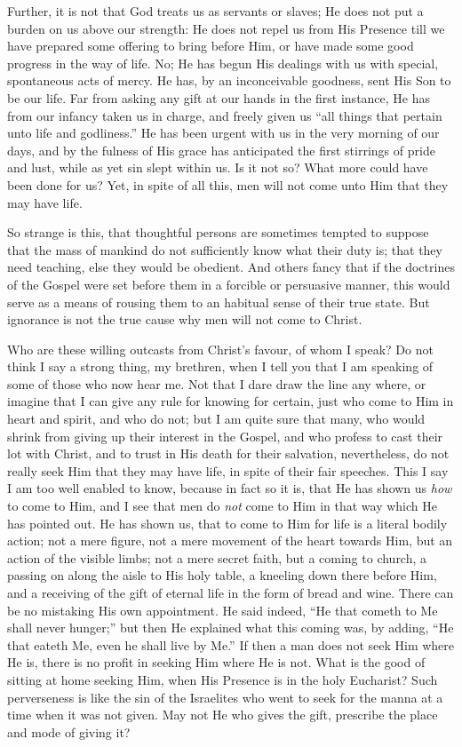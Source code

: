 Further, it is not that God treats us as servants or slaves; He
does not put a burden on us above our strength: He does not repel us
from His Presence till we have prepared some offering to bring before
Him, or have made some good progress in the way of life. No; He has
begun His dealings with us with special, spontaneous acts of mercy. He
has, by an inconceivable goodness, sent His Son to be our life. Far
from asking any gift at our hands in the first instance, He has from
our infancy taken us in charge, and freely given us ``all things
that pertain unto life and godliness.'' He has been urgent with us
in the very morning of our days, and by the fulness of His grace has
anticipated the first stirrings of pride and lust, while as yet sin
slept within us. Is it not so? What more could have been done for us?
Yet, in spite of all this, men will not come unto Him that they may
have life.

So strange is this, that thoughtful persons are sometimes tempted
to suppose that the mass of mankind do not sufficiently know what
their duty is; that they need teaching, else they would be obedient.
And others fancy that if the doctrines of the Gospel were set before
them in a forcible or persuasive manner, this would serve as a means
of rousing them to an habitual sense of their true state. But
ignorance is not the true cause why men will not come to Christ.

Who are these willing outcasts from Christ's favour, of whom I
speak? Do not think I say a strong thing, my brethren, when I tell you
that I am speaking of some of those who now hear me. Not that I dare
draw the line any where, or imagine that I can give any rule for
knowing for certain, just who come to Him in heart and spirit, and who
do not; but I am quite sure that many, who would shrink from giving up
their interest in the Gospel, and who profess to cast their lot with
Christ, and to trust in His death for their salvation, nevertheless,
do not really seek Him that they may have life, in spite of their fair
speeches. This I say I am too well enabled to know, because in fact so
it is, that He has shown us \emph{how} to come to Him, and I see that
men do \emph{not} come to Him in that way which He has pointed out. He
has shown us, that to come to Him for life is a literal bodily action;
not a mere figure, not a mere movement of the heart towards Him, but
an action of the visible limbs; not a mere secret faith, but a coming
to church, a passing on along the aisle to His holy table, a kneeling
down there before Him, and a receiving of the gift of eternal life in
the form of bread and wine. There can be no mistaking His own
appointment. He said indeed, ``He that cometh to Me shall never
hunger;'' but then He explained what this coming was, by adding,
``He that eateth Me, even he shall live by Me.'' If then a man
does not seek Him where He is, there is no profit in seeking Him where
He is not. What is the good of sitting at home seeking Him, when His
Presence is in the holy Eucharist? Such perverseness is like the sin
of the Israelites who went to seek for the manna at a time when it was
not given. May not He who gives the gift, prescribe the place and mode
of giving it?


